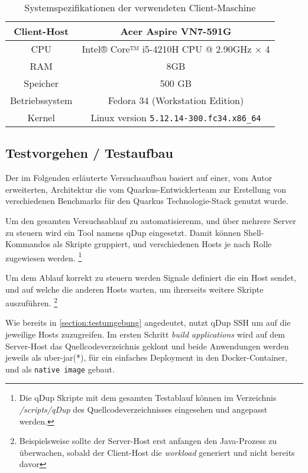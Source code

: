 \begin{table}[ht!]
  \centering
  \begin{tabular}{| c | c |}
    \hline
    Client-Host    & Acer Aspire VN7-591G                      \\
    \hline
    CPU            & Intel® Core™ i5-4210H CPU @ 2.90GHz × 4   \\
    \hline
    RAM            & 8GB                                       \\
    \hline
    Speicher       & 500 GB                                    \\
    \hline
    Betriebssystem & Fedora 34 (Workstation Edition)           \\
    \hline
    Kernel         & Linux version \verb|5.12.14-300.fc34.x86_64| \\
    \hline
  \end{tabular}
  \caption{Systemspezifikationen der verwendeten Client-Maschine}
  \label{table:system_client}
\end{table}

\subsection{Testvorgehen / Testaufbau}
\label{section:vorgehen}
Der im Folgenden erläuterte Versuchsaufbau basiert auf einer, vom Autor erweiterten, Architektur die vom Quarkus-Entwicklerteam
zur Erstellung von verschiedenen Benchmarks für den Quarkus Technologie-Stack genutzt wurde.
\parencite{QuarkusBlog, QuarkusJohnaohara}

Um den gesamten Versuchsablauf zu automatisierenm, und über mehrere Server zu steuern wird ein Tool namens qDup eingesetzt.
Damit können Shell-Kommandos als Skripte gruppiert, und verschiedenen Hosts je nach Rolle zugewiesen werden.
\footnote{Die qDup Skripte mit dem gesamten Testablauf können im Verzeichnis \textit{/scripts/qDup} des Quellcodeverzeichnisses eingesehen und
  angepasst werden.}

Um dem Ablauf korrekt zu steuern werden Signale definiert die ein Host sendet, und auf welche die anderen Hosts warten, um ihrerseits
weitere Skripte auszuführen.
\footnote{Beispielsweise sollte der Server-Host erst anfangen den Java-Prozess zu überwachen, sobald der Client-Host die \textit{workload}
  generiert und nicht bereits davor}

Wie bereits in \ref{section:testumgebung} angedeutet, nutzt qDup SSH um auf die jeweilige Hosts zuzugreifen.
Im ersten Schritt \textit{build applications} wird auf dem Server-Host das Quellcodeverzeichnis geklont und beide Anwendungen werden
jeweils als \gls{uber-jar}(*), für ein einfaches Deployment in den Docker-Container, und als \verb|native image| gebaut.

